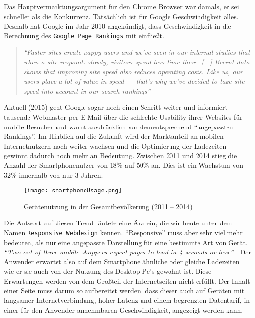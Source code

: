 		Das Hauptvermarktungsargument für den Chrome Browser war damals, er sei schneller als die Konkurrenz. Tatsächlich ist für Google Geschwindigkeit alles. Deshalb hat Google im Jahr 2010 angekündigt, dass Geschwindigkeit in die Berechnung des \texttt{Google Page Rankings} mit einfließt.

		\begin{quote}\itshape
			"`Faster sites create happy users and we've seen in our internal studies that when a site responds slowly, visitors spend less time there. [...] Recent data shows that improving site speed also reduces operating costs. Like us, our users place a lot of value in speed — that's why we've decided to take site speed into account in our search rankings"'\autocite{google10}
		\end{quote}

		Aktuell (2015) geht Google sogar noch einen Schritt weiter und informiert tausende Webmaster per E-Mail über die schlechte Usability ihrer Websites für mobile Besucher und warnt ausdrücklich vor dementsprechend "`angepassten Rankings"'.\autocite{t3n15}
		Im Hinblick auf die Zukunft wird der Marktanteil an mobilen Internetnutzern noch weiter wachsen und die Optimierung der Ladezeiten gewinnt dadurch noch mehr an Bedeutung. Zwischen 2011 und 2014 stieg die Anzahl der Smartphonenutzer von 18\% auf 50\% an. Dies ist ein Wachstum von 32\% innerhalb von nur 3 Jahren.\autocite{tns14}\\

		\begin{figure}[htbp]
			\begin{center}
				\texttt{[image: smartphoneUsage.png]}
			\end{center}
			\caption{Gerätenutzung in der Gesamtbevölkerung (2011 – 2014)\autocite{tns14}}
			\label{fig:geraetenutzung}
		\end{figure}

		Die Antwort auf diesen Trend läutete eine Ära ein, die wir heute unter dem Namen \texttt{Responsive Webdesign} kennen. "`Responsive"' muss aber sehr viel mehr bedeuten, als nur eine angepasste Darstellung für eine bestimmte Art von Gerät. \textit{"`Two out of three mobile shoppers expect pages to load in 4 seconds or less."'} \autocite{radware13}. Der Anwender erwartet also auf dem Smartphone ähnliche oder gleiche Ladezeiten wie er sie auch von der Nutzung des Desktop Pc's gewohnt ist. Diese Erwartungen werden von dem Großteil der Internetseiten nicht erfüllt. Der Inhalt einer Seite muss darum so aufbereitet werden, dass dieser auch auf Geräten mit langsamer Internetverbindung, hoher Latenz und einem begrenzten Datentarif, in einer für den Anwender annehmbaren Geschwindigkeit, angezeigt werden kann.\\

